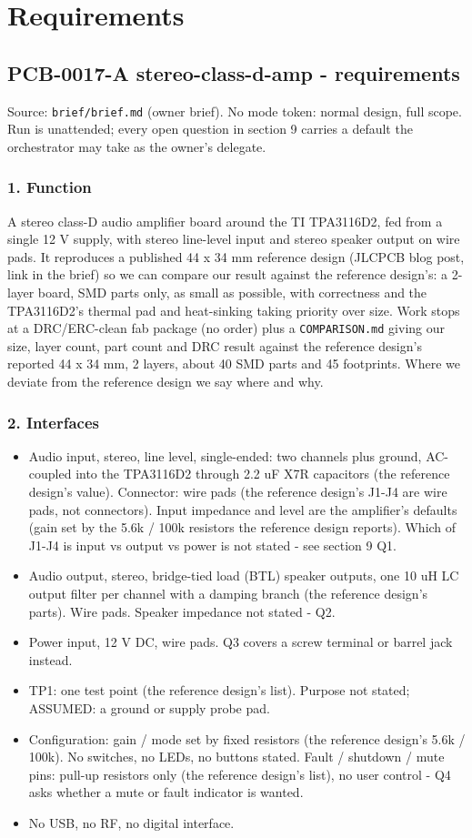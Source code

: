\documentclass[11pt]{article}
\begin{document}
\section{Requirements}
\subsection*{PCB-0017-A stereo-class-d-amp - requirements}
Source: \texttt{brief/brief.md} (owner brief). No mode token: normal design, full scope. Run is unattended; every open question in section 9 carries a default the orchestrator may take as the owner's delegate.

\subsubsection*{1. Function}
A stereo class-D audio amplifier board around the TI TPA3116D2, fed from a single 12 V supply, with stereo line-level input and stereo speaker output on wire pads. It reproduces a published 44 x 34 mm reference design (JLCPCB blog post, link in the brief) so we can compare our result against the reference design's: a 2-layer board, SMD parts only, as small as possible, with correctness and the TPA3116D2's thermal pad and heat-sinking taking priority over size. Work stops at a DRC/ERC-clean fab package (no order) plus a \texttt{COMPARISON.md} giving our size, layer count, part count and DRC result against the reference design's reported 44 x 34 mm, 2 layers, about 40 SMD parts and 45 footprints. Where we deviate from the reference design we say where and why.

\subsubsection*{2. Interfaces}
\begin{itemize}
\item Audio input, stereo, line level, single-ended: two channels plus ground, AC-coupled into the
TPA3116D2 through 2.2 uF X7R capacitors (the reference design's value). Connector: wire pads (the reference design's J1-J4
are wire pads, not connectors). Input impedance and level are the amplifier's defaults
(gain set by the 5.6k / 100k resistors the reference design reports). Which of J1-J4 is input vs output vs
power is not stated - see section 9 Q1.
\item Audio output, stereo, bridge-tied load (BTL) speaker outputs, one 10 uH LC output filter per
channel with a damping branch (the reference design's parts). Wire pads. Speaker impedance not stated - Q2.
\item Power input, 12 V DC, wire pads. Q3 covers a screw terminal or barrel jack instead.
\item TP1: one test point (the reference design's list). Purpose not stated; ASSUMED: a ground or supply probe pad.
\item Configuration: gain / mode set by fixed resistors (the reference design's 5.6k / 100k). No switches, no LEDs,
no buttons stated. Fault / shutdown / mute pins: pull-up resistors only (the reference design's list), no user
control - Q4 asks whether a mute or fault indicator is wanted.
\item No USB, no RF, no digital interface.
\end{itemize}
\end{document}
